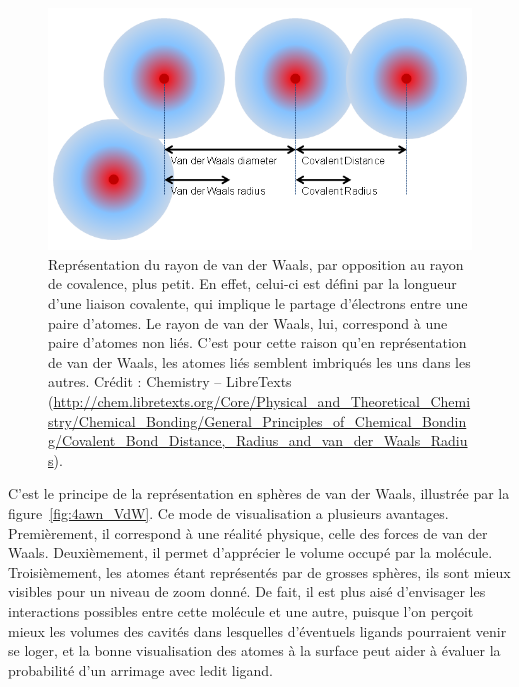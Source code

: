 	\begin{figure}[H]
    	\centering
    	\includegraphics[width=\textwidth]{figures/ch1/vdwradius}
    	\caption{Représentation du rayon de van der Waals, par opposition au rayon de covalence, plus petit. En effet, celui-ci est défini par la longueur d'une liaison covalente, qui implique le partage d'électrons entre une paire d'atomes. Le rayon de van der Waals, lui, correspond à une paire d'atomes non liés. C'est pour cette raison qu'en représentation de van der Waals, les atomes liés semblent imbriqués les uns dans les autres. Crédit : Chemistry -- LibreTexts (\url{http://chem.libretexts.org/Core/Physical_and_Theoretical_Chemistry/Chemical_Bonding/General_Principles_of_Chemical_Bonding/Covalent_Bond_Distance,_Radius_and_van_der_Waals_Radius}).}
   		\label{fig:vdwradius}
    \end{figure}
		
	C'est le principe de la représentation en sphères de van der Waals, illustrée par la figure~\ref{fig:4awn_VdW}. Ce mode de visualisation a plusieurs avantages. Premièrement, il correspond à une réalité physique, celle des forces de van der Waals. Deuxièmement, il permet d'apprécier le volume occupé par la molécule. Troisièmement, les atomes étant représentés par de grosses sphères, ils sont mieux visibles pour un niveau de zoom donné. De fait, il est plus aisé d'envisager les interactions possibles entre cette molécule et une autre, puisque l'on perçoit mieux les volumes des cavités dans lesquelles d'éventuels ligands pourraient venir se loger, et la bonne visualisation des atomes à la surface peut aider à évaluer la probabilité d'un arrimage avec ledit ligand.
		

